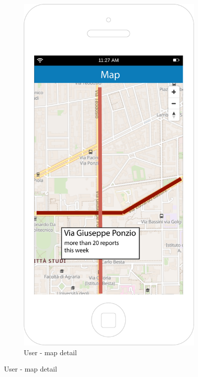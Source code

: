 \documentclass[12pt,a4paper]{report}
\begin{document}
\begin{figure}[H]
\begin{subfigure}{0.5\textwidth}
		\end{subfigure}
		\begin{subfigure}{0.5\textwidth}
			\includegraphics[scale=0.25, center]{Map-detail}
			\caption{User -  map detail}
			\label{fig:subim2}
		\end{subfigure}
		\end{figure}
\end{document}
